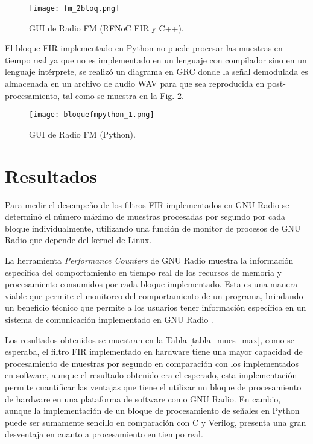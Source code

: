 \documentclass[12pt]{difu100cia} %
\begin{document}
\begin{figure}[!ht]
	\centering
	\texttt{[image: fm\_2bloq.png]}
	\caption{GUI de Radio FM (RFNoC FIR y C++).}
	\label{bloflow_result}
\end{figure}

El bloque FIR implementado en Python no puede procesar las muestras en tiempo real ya que no es implementado en un lenguaje con compilador sino en un lenguaje intérprete, se realizó un diagrama en GRC donde la señal demodulada es almacenada en un archivo de audio WAV para que sea reproducida en post-procesamiento, tal como se muestra en la Fig. \ref{bloquefmpytho}.

\begin{figure}[!ht]
	\centering
	\texttt{[image: bloquefmpython\_1.png]}
	\caption{GUI de Radio FM (Python).}
	\label{bloquefmpytho}
\end{figure}

\section{Resultados}
\label{resultados}

Para medir el desempeño de los filtros FIR implementados en GNU Radio se determinó el número máximo de muestras procesadas por segundo por cada bloque individualmente, utilizando una función de monitor de procesos de GNU Radio que depende del kernel de Linux. 

La herramienta \textit{Performance Counters} de GNU Radio muestra la información específica del comportamiento en tiempo real de los recursos de memoria y procesamiento consumidos por cada bloque implementado. Esta es una manera viable que permite el monitoreo del comportamiento de un programa, brindando un beneficio técnico que permite a los usuarios tener información específica en un sistema de comunicación implementado en GNU Radio \cite{zitounihardware}.

Los resultados obtenidos se muestran en la Tabla \ref{tabla_mues_max}, como se esperaba, el filtro FIR implementado en hardware tiene una mayor capacidad de procesamiento de muestras por segundo en comparación con los implementados en software, aunque el resultado obtenido era el esperado, esta implementación permite cuantificar las ventajas que tiene el utilizar un bloque de procesamiento de hardware en una plataforma de software como GNU Radio. En cambio, aunque la implementación de un bloque de procesamiento de señales en Python puede ser sumamente sencillo en comparación con C y Verilog, presenta una gran desventaja en cuanto a procesamiento en tiempo real.
\end{document}
